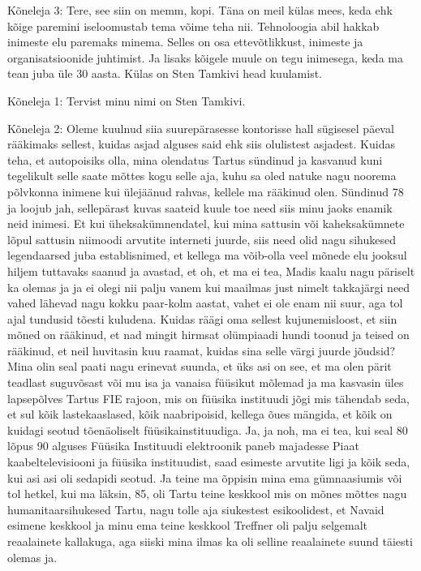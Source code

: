 
                 
Kõneleja 3:
Tere, see siin on memm, kopi. Täna on meil külas mees, keda ehk kõige paremini iseloomustab tema võime teha nii. Tehnoloogia abil hakkab inimeste elu paremaks minema. Selles on osa ettevõtlikkust, inimeste ja organisatsioonide juhtimist. Ja lisaks kõigele muule on tegu inimesega, keda ma tean juba üle 30 aasta. Külas on Sten Tamkivi head kuulamist.
                 
Kõneleja 1:
Tervist minu nimi on Sten Tamkivi.
                 
Kõneleja 2:
Oleme kuulnud siia suurepärasesse kontorisse hall sügisesel päeval rääkimaks sellest, kuidas asjad alguses said ehk siis olulistest asjadest. Kuidas teha, et autopoisiks olla, mina olendatus Tartus sündinud ja kasvanud kuni tegelikult selle saate mõttes kogu selle aja, kuhu sa oled natuke nagu noorema põlvkonna inimene kui ülejäänud rahvas, kellele ma rääkinud olen. Sündinud 78 ja loojub jah, sellepärast kuvas saateid kuule toe need siis minu jaoks enamik neid inimesi.
Et kui üheksakümnendatel, kui mina sattusin või kaheksakümnete lõpul sattusin niimoodi arvutite interneti juurde, siis need olid nagu sihukesed legendaarsed juba establisnimed, et kellega ma võib-olla veel mõnede elu jooksul hiljem tuttavaks saanud ja avastad, et oh, et ma ei tea, Madis kaalu nagu päriselt ka olemas ja ja ei olegi nii palju vanem kui maailmas just nimelt takkajärgi need vahed lähevad nagu kokku paar-kolm aastat, vahet ei ole enam nii suur, aga tol ajal tundusid tõesti kuludena. Kuidas räägi oma sellest kujunemisloost, et siin mõned on rääkinud, et nad mingit hirmsat olümpiaadi hundi toonud ja teised on rääkinud, et neil huvitasin kuu raamat, kuidas sina selle värgi juurde jõudsid? Mina olin seal paati nagu erinevat suunda, et üks asi on see, et ma olen pärit teadlast suguvõsast või mu isa ja vanaisa füüsikut mõlemad ja ma kasvasin üles lapsepõlves Tartus FIE rajoon, mis on füüsika instituudi jõgi mis tähendab seda, et sul kõik lastekaaslased, kõik naabripoisid, kellega õues mängida, et kõik on kuidagi seotud tõenäoliselt füüsikainstituudiga. Ja, ja noh, ma ei tea, kui seal 80 lõpus 90 alguses Füüsika Instituudi elektroonik paneb majadesse Piaat kaabeltelevisiooni ja füüsika instituudist, saad esimeste arvutite ligi ja kõik seda, kui asi asi oli sedapidi seotud. Ja teine ma õppisin mina ema gümnaasiumis või tol hetkel, kui ma läksin, 85, oli Tartu teine keskkool mis on mõnes mõttes nagu humanitaarsihukesed Tartu, nagu tolle aja siukestest esikoolidest, et Navaid esimene keskkool ja minu ema teine keskkool Treffner oli palju selgemalt reaalainete kallakuga, aga siiski mina ilmas ka oli selline reaalainete suund täiesti olemas ja.
